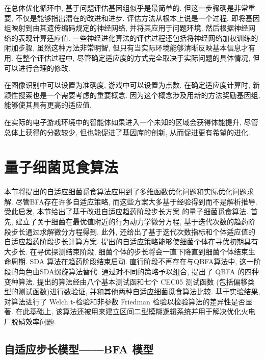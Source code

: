 在总体优化循环中, 基于问题评估基因组似乎是最简单的. 但这一步骤确是非常重要, 不仅是能够指出潜在的改进和进步. 评估方法从根本上说是一个过程, 即将基因组映射到由其遗传编码规定的神经网络, 并将其应用于问题环境, 然后根据神经网络的表现计算适应值. 一些神经进化算法的评估过程还包括将神经网络加权训练的附加步骤, 虽然这种方法非常明智, 但只有当实际环境能够清晰反映基本信息才有用. 在整个评估过程中, 尽管确定适应度的方式完全取决于实际问题的具体情况, 但可以进行合理的修改.
\begin{example}
    在图像识别中可以设置为准确度, 游戏中可以设置为点数. 在确定适应度计算时, 新颖性搜索也是一个需要考虑的重要概念. 因为这个概念涉及用新的方法奖励基因组, 能够使其具有更高的适应值.
\end{example}
\begin{example}
    在实际的电子游戏环境中的智能体如果进入一个未知的区域会获得体能提升, 尽管总体上获得的分数较少, 但也能促进了基因库的创新, 从而促进更有希望的进化.
\end{example}
\section{量子细菌觅食算法}
本节将提出的自适应细菌觅食算法应用到了多维函数优化问题和实际优化问题求解. 尽管BFA存在许多自适应策略, 而这些方案大多基于经验得到而不是解析推导. 受此启发, 本节给出了基于改进自适应趋药阶段步长方案 的量子细菌觅食算法. 首先, 建立了关于细菌在最优值附近的行为动力学微分方程, 基于迭代次数的趋药阶段步长通过求解微分方程得到. 此外, 还给出了基于迭代次数指标和个体适应值的自适应趋药阶段步长计算方案. 提出的自适应策略能够使细菌个体在寻优初期具有大步长. 在寻优探测结束阶段, 细菌个体的步长将会一直下降直到细菌个体结束生命周期. SDA 算法在趋药阶段结束启动. 直行阶段不再存在与QBFA算法中, 这一阶段的角色由SDA螺旋算法替代. 通过对不同的策略予以组合, 提出了 QBFA 的四种变种算法.
提出的算法经由八个基本测试函和七个  CEC05 测试函数 (包括偏移类型的测试函数)进行数验证, 并和其他两种自适应细菌觅食算法比较. 基于实验结果, 对算法进行了 Welch t-检验和非参数 Friedman 检验以检验算法的差异性是否显著.
在此基础上, 该算法还被用来建立区间二型模糊逻辑系统并用于解决优化火电厂脱硝效率问题.
\subsection{自适应步长模型——BFA 模型}\label{TPMsec1}

